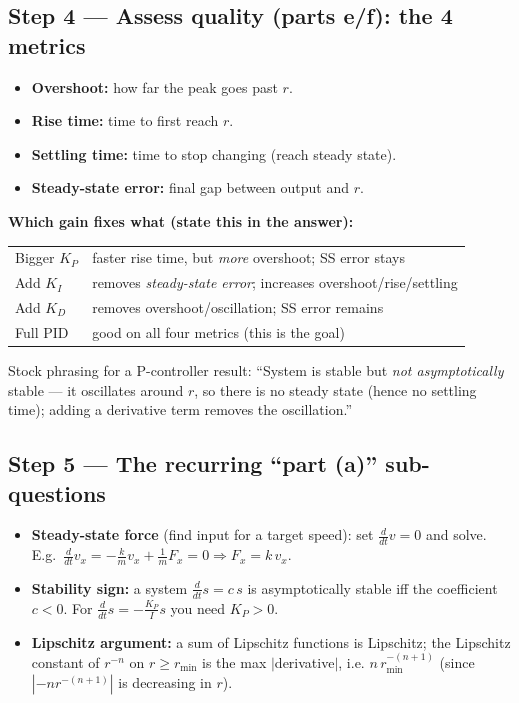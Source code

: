 \subsection*{Step 4 --- Assess quality (parts e/f): the 4 metrics}
\begin{itemize}
  \item \textbf{Overshoot:} how far the peak goes past $r$.
  \item \textbf{Rise time:} time to first reach $r$.
  \item \textbf{Settling time:} time to stop changing (reach steady state).
  \item \textbf{Steady-state error:} final gap between output and $r$.
\end{itemize}
\textbf{Which gain fixes what (state this in the answer):}
\begin{center}
\begin{tabular}{ll}
\hline
Bigger $K_P$ & faster rise time, but \emph{more} overshoot; SS error stays \\
Add $K_I$ & removes \emph{steady-state error}; increases overshoot/rise/settling \\
Add $K_D$ & removes overshoot/oscillation; SS error remains \\
Full PID & good on all four metrics (this is the goal) \\
\hline
\end{tabular}
\end{center}
Stock phrasing for a P-controller result: ``System is stable but \emph{not asymptotically} stable
--- it oscillates around $r$, so there is no steady state (hence no settling time); adding a
derivative term removes the oscillation.''

\subsection*{Step 5 --- The recurring ``part (a)'' sub-questions}
\begin{itemize}
  \item \textbf{Steady-state force} (find input for a target speed): set $\frac{d}{dt}v = 0$ and solve.
        E.g.\ $\frac{d}{dt}v_x = -\frac{k}{m}v_x + \frac{1}{m}F_x = 0 \Rightarrow F_x = k\,v_x$.
  \item \textbf{Stability sign:} a system $\frac{d}{dt}s = c\,s$ is asymptotically stable iff the
        coefficient $c<0$. For $\frac{d}{dt}s = -\frac{K_P}{I}s$ you need $K_P>0$.
  \item \textbf{Lipschitz argument:} a sum of Lipschitz functions is Lipschitz; the Lipschitz
        constant of $r^{-n}$ on $r \ge r_{\min}$ is the max $|$derivative$|$, i.e.
        $n\,r_{\min}^{-(n+1)}$ (since $|{-n}r^{-(n+1)}|$ is decreasing in $r$).
\end{itemize}

